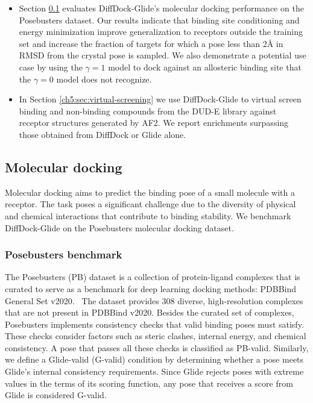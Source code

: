\begin{itemize}
    \item Section \ref{ch5:sec:molecular-docking} evaluates DiffDock-Glide's molecular docking performance on the Posebusters dataset. Our results indicate that binding site conditioning and energy minimization improve generalization to receptors outside the training set and increase the fraction of targets for which a pose less than 2{\AA} in RMSD from the crystal pose is sampled. We also demonstrate a potential use case by using the $\gamma=1$ model to dock against an allosteric binding site that the $\gamma=0$ model does not recognize.
    
    \item In Section \ref{ch5:sec:virtual-screening} we use DiffDock-Glide to virtual screen binding and non-binding compounds from the DUD-E library against receptor structures generated by AF2. We report enrichments surpassing those obtained from DiffDock or Glide alone.

\end{itemize}

\subsection{Molecular docking}
\label{ch5:sec:molecular-docking}
Molecular docking aims to predict the binding pose of a small molecule with a receptor. The task poses a significant challenge due to the diversity of physical and chemical interactions that contribute to binding stability. We benchmark DiffDock-Glide on the Posebusters molecular docking dataset.~\cite{buttenschoen2024posebusters}

\subsubsection{Posebusters benchmark}
The Posebusters (PB) dataset is a collection of protein-ligand complexes that is curated to serve as a benchmark for deep learning docking methods: PDBBind General Set v2020.~\cite{buttenschoen2024posebusters} The dataset provides 308 diverse, high-resolution complexes that are not present in PDBBind v2020. Besides the curated set of complexes, Posebusters implements consistency checks that valid binding poses must satisfy. These checks consider factors such as steric clashes, internal energy, and chemical consistency. A pose that passes all these checks is classified as PB-valid. Similarly, we define a Glide-valid (G-valid) condition by determining whether a pose meets Glide’s internal consistency requirements. Since Glide rejects poses with extreme values in the terms of its scoring function, any pose that receives a score from Glide is considered G-valid.

